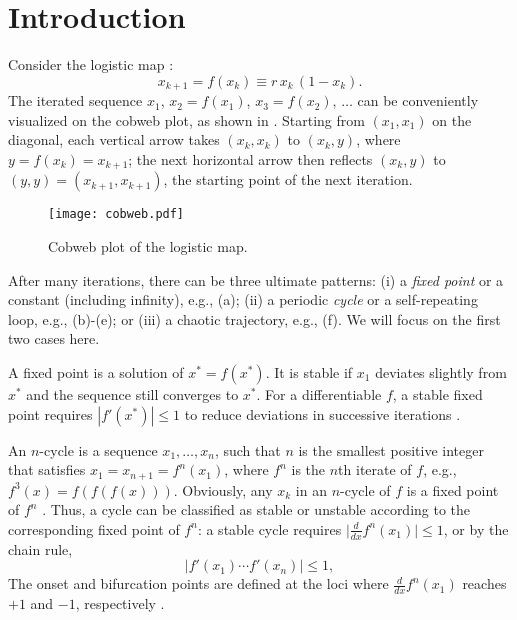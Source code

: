 \documentclass[twocolumn]{revtex4-1}
\begin{document}
%
%
\section{Introduction}
%
%

Consider the logistic map \cite{may, strogatz}:
%
\begin{equation}
  x_{k+1} = f(x_k) \equiv r \, x_k \, ( 1 - x_k ).
\label{eq:logmap}
\end{equation}
%
The iterated  sequence $x_1$,
  $x_2 = f(x_1)$,
  $x_3 = f(x_2)$, $\ldots$
can be conveniently visualized on the cobweb plot,
  as shown in .
%
Starting from $(x_1, x_1)$ on the diagonal,
  each vertical arrow takes $(x_k, x_k)$ to $(x_k, y)$,
  where $y = f(x_k) = x_{k+1}$;
the next horizontal arrow then reflects $(x_k, y)$ to
  $(y, y) = (x_{k+1}, x_{k+1})$,
  the starting point of the next iteration.
%
\begin{figure}[h]
  \begin{minipage}{\linewidth}
    \begin{center}
        \texttt{[image: cobweb.pdf]}
    \end{center}
  \end{minipage}%
  \caption{\label{fig:cobweb}
  Cobweb plot of the logistic map.}
\end{figure}
%
%
After many iterations, there can be three ultimate patterns:
  (i) a \emph{fixed point} or a constant (including infinity),
      e.g., (a);
  (ii) a periodic \emph{cycle} or a self-repeating loop,
      e.g., (b)-(e);
or
  (iii) a chaotic trajectory,
      e.g., (f).
We will focus on the first two cases here.



A fixed point is a solution of $x^* = f(x^*)$.
%
It is stable if $x_1$ deviates slightly from $x^*$
  and the sequence still converges to $x^*$.
%
For a differentiable $f$,
  a stable fixed point requires $|f'(x^*)| \le 1$
  to reduce deviations in successive iterations \cite{strogatz}.


An $n$-cycle is a sequence $x_1, \dots, x_n$,
  such that $n$ is the smallest positive integer
  that satisfies $x_1 = x_{n+1} = f^n(x_1)$,
  where $f^n$ is the $n$th iterate of $f$,
  e.g., $f^3(x) = f(f(f(x)))$.
Obviously, any $x_k$ in an $n$-cycle of $f$ is a fixed point of $f^n$
%
\big[but the converse is untrue, for a fixed point of $f^n$
  can also be a fixed point of $f^d$ for a divisor $d$ of $n$:
  if $f^d(x) = x$, then $f^n(x) = f^d(\cdots f^d(x)\cdots) = x$\big].
%
%
Thus, a cycle can be classified as stable or unstable
  according to the corresponding fixed point of $f^n$:
  a stable cycle requires
  $\big| \frac {d} {dx} f^n(x_1) \big| \le 1$,
  or by the chain rule,
%
%
%
\begin{equation}
  \Big| f'(x_1) \cdots f'(x_n) \Big| \le 1,
\label{eq:der}
\end{equation}
%
%
The onset and bifurcation points
  are defined at the loci
  where $\frac {d} {dx} f^n(x_1)$ reaches $+1$ and $-1$,
  respectively \cite{strogatz}.
%
%
%
\end{document}

